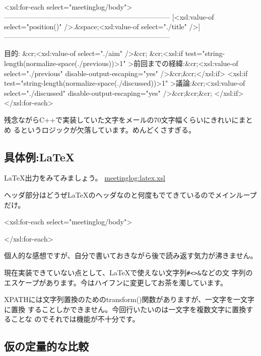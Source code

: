 \documentclass[mingoth,a4paper]{jsarticle}
\begin{document}
\begin{commandline}
    <xsl:for-each select="meetinglog/body">
-----------------------------------------------------------------------
[<xsl:value-of select="position()" />.&space;<xsl:value-of select="./title" />]
-----------------------------------------------------------------------

目的: &cr;<xsl:value-of select="./aim" />&cr;
&cr;<xsl:if
 test="string-length(normalize-space(./previous))>1"
 >前回までの経緯:&cr;<xsl:value-of select="./previous"
 disable-output-escaping="yes" />&cr;&cr;</xsl:if>
<xsl:if test="string-length(normalize-space(./discussed))>1"
 >議論:&cr;<xsl:value-of select="./discussed"
 disable-output-escaping="yes" />&cr;&cr;&cr;
</xsl:if>
</xsl:for-each>
\end{commandline}

残念ながらC++で実装していた文字をメールの70文字幅くらいにきれいにまとめ
るというロジックが欠落しています。めんどくさすぎる。

\subsection{具体例:\LaTeX}

\LaTeX 出力をみてみましょう。
\url{meetinglog:latex.xsl}

ヘッダ部分はどうぜ\LaTeX{}のヘッダなのと何度もでてきているのでメインループ
だけ。
\begin{commandline}
    <xsl:for-each select="meetinglog/body">

    </xsl:for-each>
\end{commandline}

個人的な感想ですが、自分で書いておきながら後で読み返す気力が沸きません。

現在実装できていない点として、\LaTeX{}で使えない文字列\verb!#<>&!などの文
字列のエスケープがあります。今はハイフンに変更してお茶を濁しています。

XPATHには文字列置換のためのtransform()関数がありますが、一文字を一文字に置換
することしかできません。今回行いたいのは一文字を複数文字に置換することな
のでそれでは機能が不十分です。

\subsection{仮の定量的な比較}
\end{document}
